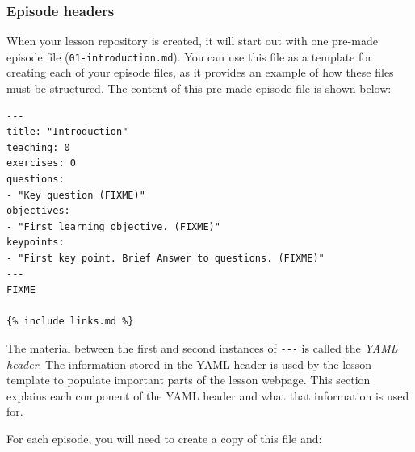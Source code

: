 \documentclass[]{book}
\begin{document}
\hypertarget{episode-headers}{%
\subsubsection{Episode headers}\label{episode-headers}}

When your lesson repository is created, it will start out with one pre-made episode file (\texttt{01-introduction.md}).
You can use this file as a template for creating each of your episode files, as it provides an
example of how these files must be structured. The content of this pre-made episode file is shown below:

\begin{verbatim}
---
title: "Introduction"
teaching: 0
exercises: 0
questions:
- "Key question (FIXME)"
objectives:
- "First learning objective. (FIXME)"
keypoints:
- "First key point. Brief Answer to questions. (FIXME)"
---
FIXME

{% include links.md %}
\end{verbatim}

The material between the first and second instances of \texttt{-\/-\/-} is called the \emph{YAML header}. The information
stored in the YAML header is used by the lesson template to populate important parts of the lesson webpage.
This section explains each component of the YAML header and what that information is used for.

For each episode, you will need to create a copy of this file and:
\end{document}
